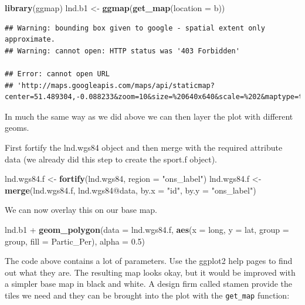 \documentclass[]{article}
\newenvironment{Shaded}{}{}
\newcommand{\KeywordTok}[1]{\textcolor[rgb]{0.00,0.44,0.13}{\textbf{{#1}}}}
\newcommand{\DataTypeTok}[1]{\textcolor[rgb]{0.56,0.13,0.00}{{#1}}}
\newcommand{\FloatTok}[1]{\textcolor[rgb]{0.25,0.63,0.44}{{#1}}}
\newcommand{\StringTok}[1]{\textcolor[rgb]{0.25,0.44,0.63}{{#1}}}
\newcommand{\NormalTok}[1]{{#1}}
\begin{document}
\begin{Shaded}
\begin{Highlighting}[]
\KeywordTok{library}\NormalTok{(ggmap)}
\NormalTok{lnd.b1 <- }\KeywordTok{ggmap}\NormalTok{(}\KeywordTok{get_map}\NormalTok{(}\DataTypeTok{location =} \NormalTok{b))}
\end{Highlighting}
\end{Shaded}
\begin{verbatim}
## Warning: bounding box given to google - spatial extent only approximate.
## Warning: cannot open: HTTP status was '403 Forbidden'

## Error: cannot open URL
## 'http://maps.googleapis.com/maps/api/staticmap?center=51.489304,-0.088233&zoom=10&size=%20640x640&scale=%202&maptype=terrain&sensor=false'
\end{verbatim}
In much the same way as we did above we can then layer the plot with
different geoms.

First fortify the lnd.wgs84 object and then merge with the required
attribute data (we already did this step to create the sport.f object).

\begin{Shaded}
\begin{Highlighting}[]
\NormalTok{lnd.wgs84.f <- }\KeywordTok{fortify}\NormalTok{(lnd.wgs84, }\DataTypeTok{region =} \StringTok{"ons_label"}\NormalTok{)}
\NormalTok{lnd.wgs84.f <- }\KeywordTok{merge}\NormalTok{(lnd.wgs84.f, lnd.wgs84@data, }\DataTypeTok{by.x =} \StringTok{"id"}\NormalTok{, }\DataTypeTok{by.y =} \StringTok{"ons_label"}\NormalTok{)}
\end{Highlighting}
\end{Shaded}
We can now overlay this on our base map.

\begin{Shaded}
\begin{Highlighting}[]
\NormalTok{lnd.b1 + }\KeywordTok{geom_polygon}\NormalTok{(}\DataTypeTok{data =} \NormalTok{lnd.wgs84.f, }\KeywordTok{aes}\NormalTok{(}\DataTypeTok{x =} \NormalTok{long, }\DataTypeTok{y =} \NormalTok{lat, }\DataTypeTok{group =} \NormalTok{group, }
    \DataTypeTok{fill =} \NormalTok{Partic_Per), }\DataTypeTok{alpha =} \FloatTok{0.5}\NormalTok{)}
\end{Highlighting}
\end{Shaded}
The code above contains a lot of parameters. Use the ggplot2 help pages
to find out what they are. The resulting map looks okay, but it would be
improved with a simpler base map in black and white. A design firm
called stamen provide the tiles we need and they can be brought into the
plot with the \texttt{get\_map} function:
\end{document}
